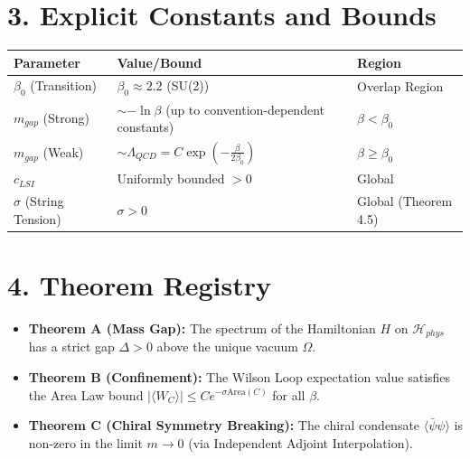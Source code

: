 \section*{3. Explicit Constants and Bounds}

\begin{table}[h]
\centering
\begin{tabular}{|l|l|l|}
\hline
\textbf{Parameter} & \textbf{Value/Bound} & \textbf{Region} \\ \hline
$\beta_0$ (Transition) & $\beta_0 \approx 2.2$ (SU(2)) & Overlap Region \\ \hline
$m_{gap}$ (Strong) & $\sim -\ln \beta$ (up to convention-dependent constants) & $\beta < \beta_0$ \\ \hline
$m_{gap}$ (Weak) & $\sim \Lambda_{QCD} = C \exp(-\frac{\beta}{2\beta_0})$ & $\beta \ge \beta_0$ \\ \hline
$c_{LSI}$ & Uniformly bounded $> 0$ & Global \\ \hline
$\sigma$ (String Tension) & $\sigma > 0$ & Global (Theorem 4.5) \\ \hline
\end{tabular}
\end{table}

\section*{4. Theorem Registry}

\begin{itemize}
    \item \textbf{Theorem A (Mass Gap):} The spectrum of the Hamiltonian $H$ on $\mathcal{H}_{phys}$ has a strict gap $\Delta > 0$ above the unique vacuum $\Omega$.
    \item \textbf{Theorem B (Confinement):} The Wilson Loop expectation value satisfies the Area Law bound $|\langle W_C \rangle| \le C e^{-\sigma \text{Area}(C)}$ for all $\beta$.
    \item \textbf{Theorem C (Chiral Symmetry Breaking):} The chiral condensate $\langle \bar{\psi}\psi \rangle$ is non-zero in the limit $m \to 0$ (via Independent Adjoint Interpolation).
\end{itemize}
